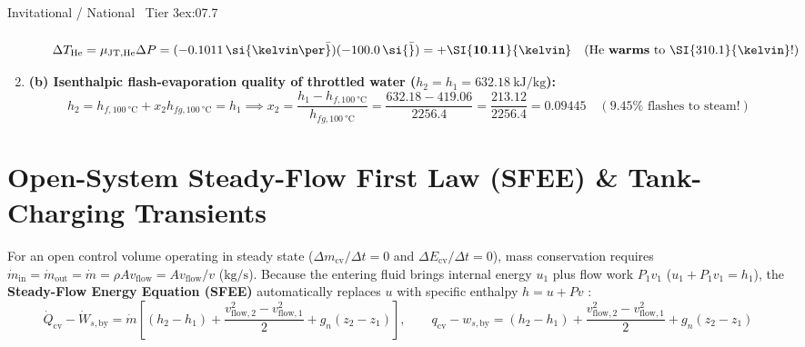 \begin{workedexample}{Invitational / National \textbar\ Tier 3}{ex:07.7}
\begin{enumerate}
\begin{itemize}
\[    \]
    \[
      \Delta T_{\mathrm{He}} = \mu_{\mathrm{JT,He}}\Delta P = (-0.1011\,\si{\kelvin\per\bar})(-100.0\,\si{\bar}) = \mathbf{+\SI{10.11}{\kelvin}} \quad (\mathrm{He}\text{ \textbf{warms} to } \SI{310.1}{\kelvin}!)
    \]
  \end{itemize}
  \item \textbf{(b) Isenthalpic flash-evaporation quality of throttled water ($h_2 = h_1 = \SI{632.18}{\kilo\joule\per\kilogram}$):}
  \[
    h_2 = h_{f,\SI{100}{\celsius}} + x_2 h_{fg,\SI{100}{\celsius}} = h_1 \implies x_2 = \frac{h_1 - h_{f,\SI{100}{\celsius}}}{h_{fg,\SI{100}{\celsius}}} = \frac{632.18 - 419.06}{2256.4} = \frac{213.12}{2256.4} = \mathbf{0.09445} \quad (9.45\%\text{ flashes to steam!})
  \]
\end{enumerate}
\end{workedexample}

\section{Open-System Steady-Flow First Law (SFEE) \& Tank-Charging Transients}\label{sec:07.7}

For an open control volume operating in steady state ($\Delta m_{\mathrm{cv}}/\Delta t = 0$ and $\Delta E_{\mathrm{cv}}/\Delta t = 0$), mass conservation requires $\dot{m}_{\mathrm{in}} = \dot{m}_{\mathrm{out}} = \dot{m} = \rho A v_{\mathrm{flow}} = A v_{\mathrm{flow}}/v$ ($\si{\kilogram\per\second}$). Because the entering fluid brings internal energy $u_1$ plus flow work $P_1 v_1$ ($u_1 + P_1 v_1 = h_1$), the \textbf{Steady-Flow Energy Equation (SFEE)} automatically replaces $u$ with specific enthalpy $h = u + Pv$ :
\begin{equation}\label{eq:07:sfee}
  \boxed{\dot{Q}_{\mathrm{cv}} - \dot{W}_{s,\mathrm{by}} = \dot{m}\left[(h_2 - h_1) + \frac{v_{\mathrm{flow},2}^2 - v_{\mathrm{flow},1}^2}{2} + g_n(z_2 - z_1)\right]}, \qquad q_{\mathrm{cv}} - w_{s,\mathrm{by}} = (h_2 - h_1) + \frac{v_{\mathrm{flow},2}^2 - v_{\mathrm{flow},1}^2}{2} + g_n(z_2 - z_1)
\end{equation}


